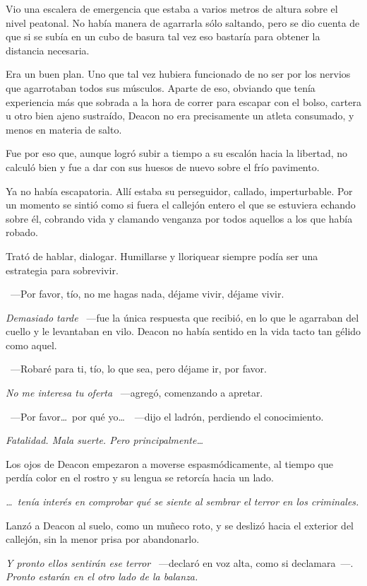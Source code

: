 Vio una escalera de emergencia que estaba a varios metros de altura sobre el nivel peatonal. No había manera de agarrarla sólo saltando, pero se dio cuenta de que si se subía en un cubo de basura tal vez eso bastaría para obtener la distancia necesaria.

Era un buen plan. Uno que tal vez hubiera funcionado de no ser por los nervios que agarrotaban todos sus músculos. Aparte de eso, obviando que tenía experiencia más que sobrada a la hora de correr para escapar con el bolso, cartera u otro bien ajeno sustraído, Deacon no era precisamente un atleta consumado, y menos en materia de salto.

Fue por eso que, aunque logró subir a tiempo a su escalón hacia la libertad, no calculó bien y fue a dar con sus huesos de nuevo sobre el frío pavimento.

Ya no había escapatoria. Allí estaba su perseguidor, callado, imperturbable. Por un momento se sintió como si fuera el callejón entero el que se estuviera echando sobre él, cobrando vida y clamando venganza por todos aquellos a los que había robado.

Trató de hablar, dialogar. Humillarse y lloriquear siempre podía ser una estrategia para sobrevivir.

~---Por favor, tío, no me hagas nada, déjame vivir, déjame vivir.

\emph{Demasiado tarde} ~---fue la única respuesta que recibió, en lo que le agarraban del cuello y le levantaban en vilo. Deacon no había sentido en la vida tacto tan gélido como aquel.

~---Robaré para ti, tío, lo que sea, pero déjame ir, por favor.

\emph{No me interesa tu oferta} ~---agregó, comenzando a apretar.

~---Por favor\dots\ por qué yo\dots\ ~---dijo el ladrón, perdiendo el conocimiento.

\emph{Fatalidad. Mala suerte. Pero principalmente\dots}

Los ojos de Deacon empezaron a moverse espasmódicamente, al tiempo que perdía color en el rostro y su lengua se retorcía hacia un lado.

\emph{\dots\ tenía interés en comprobar qué se siente al sembrar el terror en los criminales.}

Lanzó a Deacon al suelo, como un muñeco roto, y se deslizó hacia el exterior del callejón, sin la menor prisa por abandonarlo.

\emph{Y pronto ellos sentirán ese terror} ~---declaró en voz alta, como si declamara~---. \emph{Pronto estarán en el otro lado de la balanza.}

